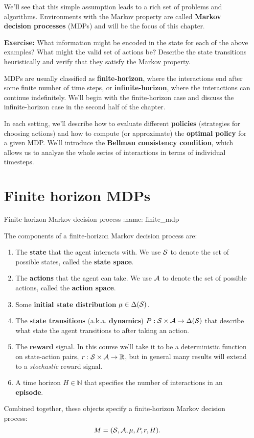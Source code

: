 \documentclass[\main/main]{subfiles}
\begin{document}
We'll see that this simple assumption leads to a rich set of problems and algorithms. Environments with the Markov property are called \textbf{Markov decision processes} (MDPs) and will be the focus of this chapter.

\textbf{Exercise:} What information might be encoded in the state for each of the above examples? What might the valid set of actions be? Describe the state transitions heuristically and verify that they satisfy the Markov property.

MDPs are usually classified as \textbf{finite-horizon}, where the interactions end after some finite number of time steps, or \textbf{infinite-horizon}, where the interactions can continue indefinitely. We'll begin with the finite-horizon case and discuss the infinite-horizon case in the second half of the chapter.

In each setting, we'll describe how to evaluate different \textbf{policies} (strategies for choosing actions) and how to compute (or approximate) the \textbf{optimal policy} for a given MDP. We'll introduce the \textbf{Bellman consistency condition}, which allows us to analyze the whole series of interactions in terms of individual timesteps.

\newpage
\section{Finite horizon MDPs}


\begin{definition}{Finite-horizon Markov decision process}
:name: finite_mdp

The components of a finite-horizon Markov decision process are:

\begin{enumerate}
    \item The \textbf{state} that the agent interacts with. We use $\S$ to denote the set of possible states, called the \textbf{state space}.
    \item The \textbf{actions} that the agent can take. We use $\A$ to denote the set of possible actions, called the \textbf{action space}.
    \item Some \textbf{initial state distribution} $\mu \in \Delta(\S)$.
    \item The \textbf{state transitions} (a.k.a. \textbf{dynamics}) $P : \S \times \A \to \Delta(\S)$ that describe what state the agent transitions to after taking an action.
    \item The \textbf{reward} signal. In this course we'll take it to be a deterministic function on state-action pairs, $r : \S \times \A \to \mathbb{R}$, but in general many results will extend to a \emph{stochastic} reward signal.
    \item A time horizon $H \in \mathbb{N}$ that specifies the number of interactions in an \textbf{episode}.
\end{enumerate}

Combined together, these objects specify a finite-horizon Markov decision process:
\[
    M = (\S, \A, \mu, P, r, H).
\]
\end{definition}
\end{document}

